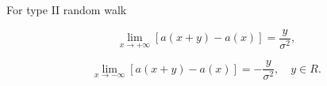For type II random walk

$$\lim_{x \to +\infty} [a(x + y) - a(x)] = \frac{y}{\sigma^2},$$

$$\lim_{x \to -\infty} [a(x + y) - a(x)] = -\frac{y}{\sigma^2}, \quad y \in R.$$